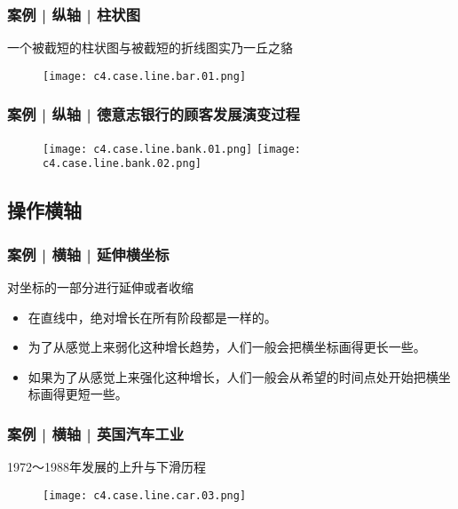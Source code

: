 \begin{frame}
  \frametitle{案例 | 纵轴 | 柱状图}
  \begin{block}{一个被截短的柱状图与被截短的折线图实乃一丘之貉}
  \begin{figure}
    \centering
    \texttt{[image: c4.case.line.bar.01.png]}
  \end{figure}
  \end{block}
\end{frame}

\begin{frame}
  \frametitle{案例 | 纵轴 | 德意志银行的顾客发展演变过程}
  \begin{figure}
    \centering
    \texttt{[image: c4.case.line.bank.01.png]}\quad
    \texttt{[image: c4.case.line.bank.02.png]}
  \end{figure}
\end{frame}

\subsection{操作横轴}
\begin{frame}
  \frametitle{案例 | 横轴 | 延伸横坐标}
  \begin{block}{对坐标的一部分进行延伸或者收缩}
    \begin{itemize}
      \item<1-> 在直线中，绝对增长在所有阶段都是一样的。
      \item<2-> 为了从感觉上来弱化这种增长趋势，人们一般会把横坐标画得更长一些。
      \item<3-> 如果为了从感觉上来强化这种增长，人们一般会从希望的时间点处开始把横坐标画得更短一些。
    \end{itemize}
    \begin{figure}
      \centering
    \end{figure}
  \end{block}
\end{frame}

\begin{frame}
  \frametitle{案例 | 横轴 | 英国汽车工业}
  \begin{block}{1972～1988年发展的上升与下滑历程}
    \begin{figure}
      \centering
      \texttt{[image: c4.case.line.car.03.png]}
    \end{figure}
  \end{block}
\end{frame}

